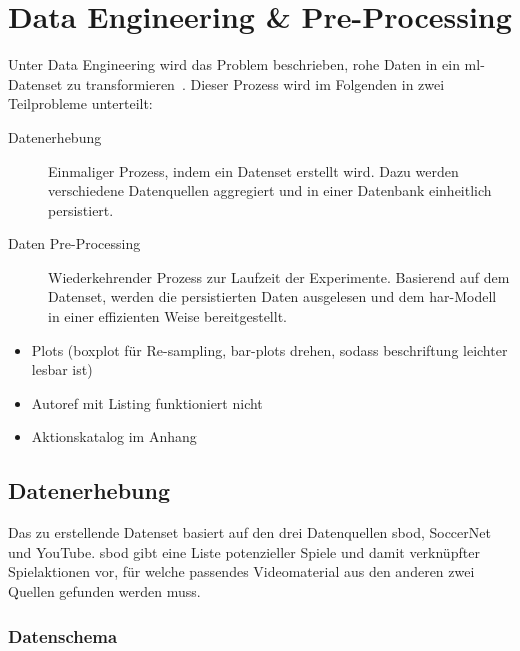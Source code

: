 \chapter{Data Engineering \& Pre-Processing}
\label{ch:data}

\newcommand{\noaction}{37521\ }
\newcommand{\novideos}{194\ }
\newcommand{\nomatches}{152\ }

Unter Data Engineering wird das Problem beschrieben, rohe Daten in ein \gls{ml}-Datenset zu transformieren~\cite{Burkov19}.
Dieser Prozess wird im Folgenden in zwei Teilprobleme unterteilt:
\begin{description}
    \item[Datenerhebung] Einmaliger Prozess, indem ein Datenset erstellt wird.
        Dazu werden verschiedene Datenquellen aggregiert und in einer Datenbank einheitlich persistiert.
    \item[Daten Pre-Processing] Wiederkehrender Prozess zur Laufzeit der Experimente.
        Basierend auf dem Datenset, werden die persistierten Daten ausgelesen und dem \gls{har}-Modell in einer effizienten Weise bereitgestellt.
\end{description}

\begin{tcolorbox}[title=WIP]
    \begin{itemize}
        \item Plots (boxplot für Re-sampling, bar-plots drehen, sodass beschriftung leichter lesbar ist)
        \item Autoref mit Listing funktioniert nicht
        \item Aktionskatalog im Anhang
    \end{itemize}
\end{tcolorbox}


\section{Datenerhebung}
\label{sec:datenerhebung}

Das zu erstellende Datenset basiert auf den drei Datenquellen \gls{sbod}, SoccerNet und YouTube.
\gls{sbod} gibt eine Liste potenzieller Spiele und damit verknüpfter Spielaktionen vor, für welche passendes Videomaterial aus den anderen zwei Quellen gefunden werden muss.

\subsection{Datenschema}
\label{subsec:schema}

